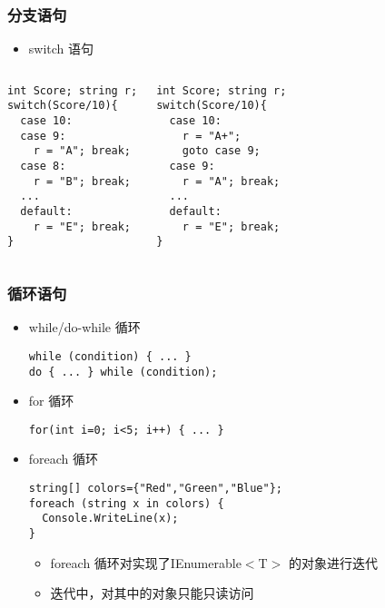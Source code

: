 \begin{frame}[fragile]
\frametitle{分支语句}
  \begin{itemize}
  \item switch 语句
  \end{itemize}
  \begin{columns}
\begin{lstlisting}
int Score; string r;
switch(Score/10){
  case 10:
  case 9:
    r = "A"; break;
  case 8:
    r = "B"; break;
  ...
  default:
    r = "E"; break;
}

\end{lstlisting}
\begin{lstlisting}
int Score; string r;
switch(Score/10){
  case 10:
    r = "A+";
    goto case 9;
  case 9:
    r = "A"; break;
  ...
  default:
    r = "E"; break;
}

\end{lstlisting}
  \end{columns}
\end{frame}
\begin{frame}[fragile]
\frametitle{循环语句}
\begin{itemize}
\item while/do-while 循环
\begin{lstlisting}
while (condition) { ... }
do { ... } while (condition);
\end{lstlisting}
  \pause
\item for 循环
\begin{lstlisting}
for(int i=0; i<5; i++) { ... }
\end{lstlisting}
  \pause
\item foreach 循环
\begin{lstlisting}
string[] colors={"Red","Green","Blue"};
foreach (string x in colors) {
  Console.WriteLine(x);
}
\end{lstlisting}
\begin{itemize}
\item foreach 循环对实现了IEnumerable$<$T$>$ 的对象进行迭代
\item 迭代中，对其中的对象只能只读访问
\end{itemize}
\end{itemize}
\end{frame}


